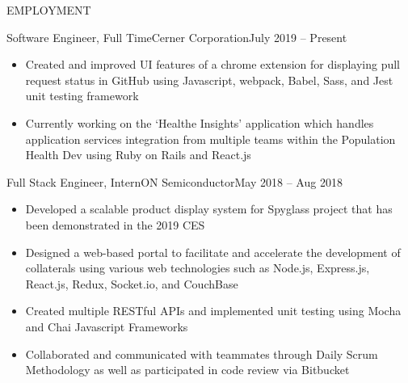 \documentclass[]{mcdowellcv}
\begin{document}
	\makeheader
	
	\begin{cvsection}{EMPLOYMENT}
		\begin{cvsubsection}{Software Engineer, Full Time}{Cerner Corporation}{July 2019 -- Present}			
			\begin{itemize}
				\item Created and improved UI features of a chrome extension for displaying pull request status in GitHub using Javascript, webpack, Babel, Sass, and Jest unit testing framework
				\item Currently working on the ‘Healthe Insights’ application which handles application services integration from multiple teams within the Population Health Dev using Ruby on Rails and React.js
			\end{itemize}
		\end{cvsubsection}
		
		\begin{cvsubsection}{Full Stack Engineer, Intern}{ON Semiconductor}{May 2018 -- Aug 2018}	
			\begin{itemize}
				\item Developed a scalable product display system for Spyglass project that has been demonstrated in the 2019 CES
				\item Designed a web-based portal to facilitate and accelerate the development of collaterals using various web technologies such as Node.js, Express.js, React.js, Redux, Socket.io, and CouchBase
				\item Created multiple RESTful APIs and implemented unit testing using Mocha and Chai Javascript Frameworks
				\item Collaborated and communicated with teammates through Daily Scrum Methodology as well as participated in code review via Bitbucket
			\end{itemize}
		\end{cvsubsection}
		

\end{cvsection}
\end{document}
